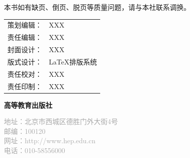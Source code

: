 \begin{titlepage}
\vspace{0.5cm}

本书如有缺页、倒页、脱页等质量问题，请与本社联系调换。

\vspace{1cm}

\begin{tabular}{ll}
策划编辑：& XXX \\
责任编辑：& XXX \\
封面设计：& XXX \\
版式设计：& LaTeX排版系统 \\
责任校对：& XXX \\
责任印制：& XXX \\
\end{tabular}

\vfill

\begin{center}
\textcolor{primarycolor}{\textbf{高等教育出版社}}

\textcolor{darkgray}{\small
地址：北京市西城区德胜门外大街4号 \\
邮编：100120 \\
网址：http://www.hep.edu.cn \\
电话：010-58556000
}
\end{center}

\end{titlepage}
